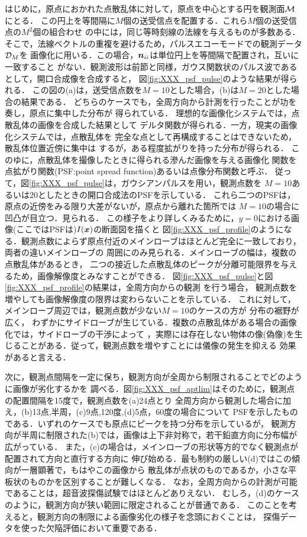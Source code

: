 はじめに，原点におかれた点散乱体に対して，原点を中心とする円を観測面${\cal M}$にとる．
この円上を等間隔に$M$個の送受信点を配置する．これら$M$個の送受信点の$M^2$個の組合わせ
の中には，同じ等時刻線の法線を与えるものが多数ある．
そこで，法線ベクトルの重複を避けるため，パルスエコーモードでの観測データ${\cal D}_M$を
画像化に用いる．この場合，$\mbox{\boldmath $n$}_{ii}$は単位円上を等間隔で配置され，互いに一致すること
がない．観測波形は前節と同様，ガウス関数状のパルス波であるとして，開口合成像を合成すると，
図\ref{fig:XXX_psf_pulse}のような結果が得られる．
この図の(a)は，送受信点数を$M=10$とした場合，(b)は$M=20$とした場合の結果である．
どちらのケースでも，全周方向から計測を行ったことが功を奏し，原点に集中した分布が
得られている．
理想的な画像化システムでは，点散乱体の画像を合成した結果として
デルタ関数が得られる．一方，現実の画像化システムでは，点散乱体を
完全な点として再構成することはできないため，散乱体位置近傍に集中は
するが，ある程度拡がりを持った分布が得られる．
このゆに，点散乱体を撮像したときに得られる滲んだ画像を与える画像化
関数を点拡がり関数(PSF:point spread function)あるいは点像分布関数と呼ぶ．
従って，図\ref{fig:XXX_psf_pulse}は，ガウシアンパルスを用い，観測点数を
$M=10$あるいは20としたときの開口合成法のPSFを示している．
これら二つのPSFは，原点の近傍をみる限り大差がないが，原点から離れた箇所では
$M=10$の場合に凹凸が目立つ．見られる．
この様子をより詳しくみるために，$y=0$における画像(ここではPSFは)$I(\mbox{\boldmath $x$})$の断面図を描くと
図\ref{fig:XXX_psf_profile}のようになる．観測点数によらず原点付近のメインローブはほとんど完全に一致しており，
両者の違いメインローブの 周囲にのみ見られる．メインローブの幅は，複数の点散乱体があるとき，
二つの接近した点散乱体のピークが分離可能限界を与えるため，画像解像度とみなすことができる．
図\ref{fig:XXX_psf_pulse}と図\ref{fig:XXX_psf_profile}の結果は，全周方向からの観測 を行う場合，
観測点数を増やしても画像解像度の限界は変わらないことを示している． 
これに対して，メインローブ周辺では，観測点数が少ない$M=10$のケースの方が 分布の裾野が広く，
わずかにサイドローブが生じている．複数の点散乱体がある場合の画像化では，サイドローブの干渉によって
，実際には存在しない物体の像(偽像)を生じることがある．従って，観測点数を増やすことには儀像の発生を抑える
効果があると言える．

次に，観測点間隔を一定に保ち，観測方向が全周から制限されることでどのように画像が劣化するかを
調べる．図\ref{fig:XXX_psf_aptlim}はそのために，観測点の配置間隔を15度で，観測点数を(a)24点とり
全周方向から観測した場合に加え，(b)13点,半周，(c)9点,120度,(d)5点，60度の場合について
PSFを示したものである．いずれのケースでも原点にピークを持つ分布を示しているが，
観測方向が半周に制限された(b)では，画像は上下非対称で，若干鉛直方向に分布幅が広がっている．
また，(c)の場合は，メインローブの形状等方的でなく観測点が配置されて方向と直行する方向に
伸び始める．最も制約の厳しい(d)ではこの傾向が一層顕著で，もはやこの画像から
散乱体が点状のものであるか，小さな平板状のものかを区別することが難しくなる．
なお，全周方向からの計測が可能であることは，超音波探傷試験ではほとんどありえない．
むしろ，(d)のケースのように，観測方向が狭い範囲に限定されることが普通である．
このことを考えると，観測方向の制限による画像劣化の様子を念頭におくことは，
探傷データを使った欠陥評価において重要である．

